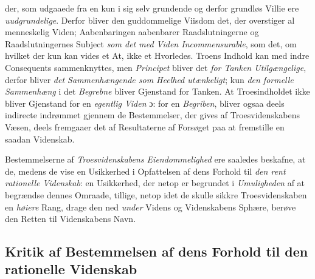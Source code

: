 \documentclass[12pt,a4paper]{book}
\newcommand{\opage}[1]{\marginnote{\footnotesize\textit{[#1]}}}
\begin{document}
der, som udgaaede fra en kun i sig selv grundende og derfor grundløs Villie ere \emph{uudgrundelige}. Derfor bliver den guddommelige Viisdom det, der overstiger al menneskelig
Viden; Aabenbaringen aabenbarer Raadslutningerne og Raadslutningernes Subject \emph{som det med Viden Incommensurable}, som det, om hvilket der kun kan vides \opage{104}et At, ikke et
Hvorledes. Troens Indhold kan med indre Consequents sammenknyttes, men \emph{Principet} bliver
det \emph{for Tanken Utilgængelige}, derfor bliver \emph{det Sammenhængende som Heelhed
utænkeligt}; kun \emph{den formelle Sammenhæng} i det \emph{Begrebne} bliver Gjenstand for Tanken.
At Troesindholdet ikke bliver Gjenstand for en \emph{egentlig Viden} ɔ: for en \emph{Begriben}, bliver ogsaa deels indirecte indrømmet gjennem de Bestemmelser, der gives af
Troesvidenskabens Væsen, deels fremgaaer det af Resultaterne af Forsøget paa at fremstille
en saadan Videnskab.

Bestemmelserne af \emph{Troesvidenskabens Eiendommelighed} ere saaledes beskafne, at de,
medens de vise en Usikkerhed i Opfattelsen af dens Forhold til \emph{den rent rationelle
Videnskab}: en Usikkerhed, der netop er begrundet i \emph{Umuligheden} af at begrændse dennes
Omraade, tillige, netop idet de skulle sikkre Troesvidenskaben en \emph{høiere} Rang, drage den ned \emph{under} Videns og Videnskabens Sphære, berøve den Retten til Videnskabens Navn.

\subsection{Kritik af Bestemmelsen af dens Forhold til den rationelle Videnskab}
\label{ssec:rationel-videnskab}
\end{document}
